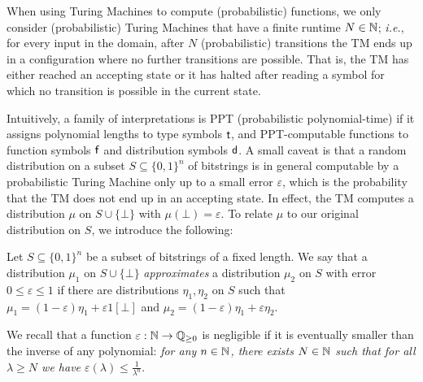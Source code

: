 When using Turing Machines to compute (probabilistic) functions, we only consider (probabilistic) Turing Machines that have a finite runtime $N \in \mathbb{N}$; \emph{i.e.}, for every input in the domain, after $N$ (probabilistic) transitions the TM ends up in a configuration where no further transitions are possible. That is, the TM has either reached an accepting state or it has halted after reading a symbol for which no transition is possible in the current state.

Intuitively, a family of interpretations is PPT (probabilistic polynomial-time) if it assigns polynomial lengths to type symbols $\mathsf{t}$, and PPT-computable functions to function symbols $\mathsf{f}$ and distribution symbols $\mathsf{d}$. A small caveat is that a random distribution on a subset $S \subseteq \{0,1\}^n$ of bitstrings is in general computable by a probabilistic Turing Machine only up to a small error $\varepsilon$, which is the probability that the TM does not end up in an accepting state. In effect, the TM computes a distribution $\mu$ on $S \cup \{\bot\}$ with $\mu(\bot) = \varepsilon$. To relate $\mu$ to our original distribution on $S$, we introduce the following:

\begin{definition}
Let $S \subseteq \{0,1\}^n$ be a subset of bitstrings of a fixed length. We say that a distribution $\mu_1$ on $S \cup \{\bot\}$ \emph{approximates} a distribution $\mu_2$ on $S$ with error $0 \leq \varepsilon \leq 1$ if there are distributions $\eta_1, \eta_2$ on $S$ such that $\mu_1 = (1 - \varepsilon) \eta_1 + \varepsilon 1[\bot]$ and $\mu_2 = (1 - \varepsilon) \eta_1 + \varepsilon \eta_2$.
\end{definition}

\noindent We recall that a function $\varepsilon : \mathbb{N} \to \mathbb{Q}_{\geq 0}$ is negligible if it is eventually smaller than the inverse of any polynomial: \emph{for any $n \in \mathbb{N}$, there exists $N \in \mathbb{N}$ such that for all $\lambda \geq N$ we have $\varepsilon(\lambda) \leq \frac{1}{\lambda^n}$}.

